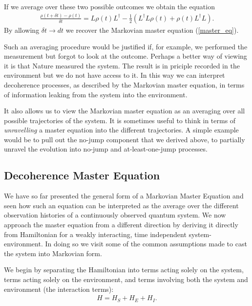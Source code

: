 If we average over these two possible outcomes we obtain the equation
\begin{align}
\frac{\rho(t + \delta t) - \rho(t)}{\delta t} = L\rho(t)L^\dagger- \frac{1}{2} \left(L^\dagger L \rho(t) + \rho(t) L^\dagger L \right).
\end{align}
By allowing $\delta t \rightarrow dt$ we recover the Markovian master equation (\ref{master_eq}). 

Such an averaging procedure would be justified if, for example, we performed the measurement but forgot to look at the outcome. Perhaps a better way of viewing it is that Nature measured the system. The result is in priciple recorded in the environment but we do not have access to it. In this way we can interpret decoherence processes, as described by the Markovian master equation, in terms of information leaking from the system into the environment.

It also allows us to view the Markovian master equation as an averaging over all possible trajectories of the system. It is sometimes useful to think in terms of \textit{unravelling} a master equation into the different trajectories. A simple example would be to pull out the no-jump component that we derived above, to partially unravel the evolution into no-jump and at-least-one-jump processes.


\subsection{Decoherence Master Equation}

We have so far presented the general form of a Markovian Master Equation and seen how such an equation can be interpreted as the average over the different observation histories of a continuously observed quantum system. We now approach the master equation from a different direction by deriving it directly from Hamiltonian for a weakly interacting, time independent system-environment. In doing so we visit some of the common assumptions made to cast the system into Markovian form.

We begin by separating the Hamiltonian into terms acting solely on the system, terms acting solely on the environment, and terms involving both the system and environment (the interaction terms):
\begin{align}
  H = H_S + H_E + H_I.
\end{align}


